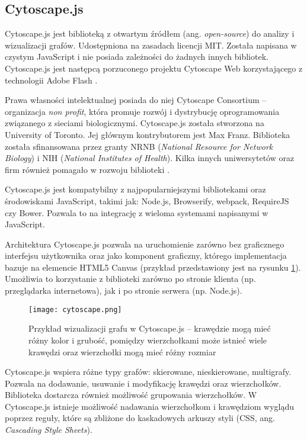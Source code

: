 \subsection{Cytoscape.js}

Cytoscape.js jest biblioteką z otwartym źródłem (ang. \textit{open-source}) do analizy i wizualizacji grafów. Udostępniona na zasadach licencji MIT. Została napisana w czystym JavaScript i nie posiada zależności do żadnych innych bibliotek. Cytoscape.js jest następcą porzuconego projektu Cytoscape Web korzystającego z technologii Adobe Flash \cite[309]{franz}. 

Prawa własności intelektualnej posiada do niej Cytoscape Consortium -- organizacja \textit{non profit}, która promuje rozwój i dystrybucję oprogramowania związanego z sieciami biologicznymi. Cytoscape.js została stworzona na University of Toronto. Jej głównym kontrybutorem jest Max Franz. Biblioteka została sfinansowana przez granty NRNB (\textit{National Resource for Network Biology}) i NIH (\textit{National Institutes of Health}). Kilka innych uniwersytetów oraz firm również pomagało w rozwoju biblioteki \cite{cytoscape}. 

Cytoscape.js jest kompatybilny z najpopularniejszymi bibliotekami oraz środowiskami JavaScript, takimi jak: Node.js, Browserify, webpack, RequireJS czy Bower. Pozwala to na integrację z wieloma systemami napisanymi w JavaScript. 

Architektura Cytoscape.js pozwala na uruchomienie zarówno bez graficznego interfejsu użytkownika oraz jako komponent graficzny, którego implementacja bazuje na elemencie HTML5 Canvas (przykład przedstawiony jest na rysunku \ref{fig:cytoscape}). Umożliwia to korzystanie z biblioteki zarówno po stronie klienta (np. przeglądarka internetowa), jak i po stronie serwera (np. Node.js).

\begin{figure}[H]
\centering
\texttt{[image: cytoscape.png]}
\caption{Przykład wizualizacji grafu w Cytoscape.js -- krawędzie mogą mieć różny kolor i grubość, pomiędzy wierzchołkami może istnieć wiele krawędzi oraz wierzchołki mogą mieć różny rozmiar}\label{fig:cytoscape}
\end{figure}

Cytoscape.js wspiera różne typy grafów: skierowane, nieskierowane, multigrafy. Pozwala na dodawanie, usuwanie i modyfikację krawędzi oraz wierzchołków. Biblioteka dostarcza również możliwość grupowania wierzchołków. W Cytoscape.js istnieje możliwość nadawania wierzchołkom i krawędziom wyglądu poprzez reguły, które są zbliżone do kaskadowych arkuszy styli (CSS, ang. \textit{Cascading Style Sheets}).

